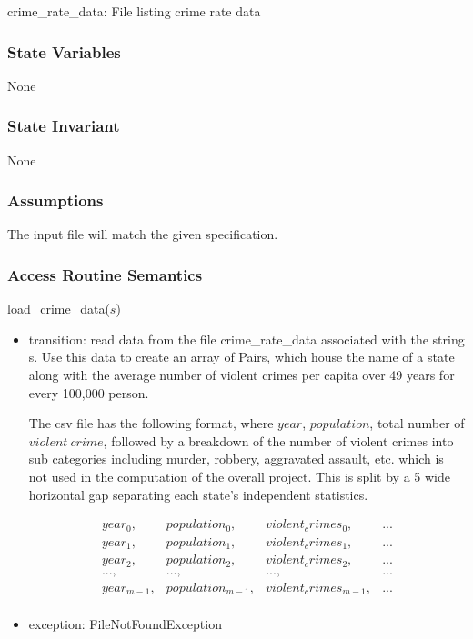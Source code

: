 \documentclass[12pt]{article}
\begin{document}
crime\_rate\_data: File listing crime rate data

\subsubsection* {State Variables}

None

\subsubsection* {State Invariant}

None

\subsubsection* {Assumptions}

The input file will match the given specification.

\subsubsection* {Access Routine Semantics}

\noindent load\_crime\_data($s$)
\begin{itemize}
\item transition: read data from the file crime\_rate\_data associated with the string s.
  Use this data to create an array of Pairs, which house the name of a state along with
  the average number of violent crimes per capita over 49 years for every 100,000 person.

  The csv file has the following format, where $year$, $population$, total number of $violent\ crime$,
  followed by a breakdown of the number of violent crimes into sub categories including murder, robbery, 
  aggravated assault, etc. which is not used in the computation of the overall project. This is split by a 5 wide
  horizontal gap separating each state's independent statistics. 

  \begin{equation}
    \begin{array}{cccc}
      year_0, & population_0, & violent_crimes_0, & . . . \\
      year_1, & population_1, & violent_crimes_1, & . . . \\
      year_2, & population_2, & violent_crimes_2, & . . . 
      \\
      ..., & ..., & ..., & ...
      \\
      year_{m-1}, & population_{m-1}, & violent_crimes_{m-1}, & . . . \\
    \end{array}
  \end{equation}

\item exception: FileNotFoundException
\end{itemize}
\end{document}
